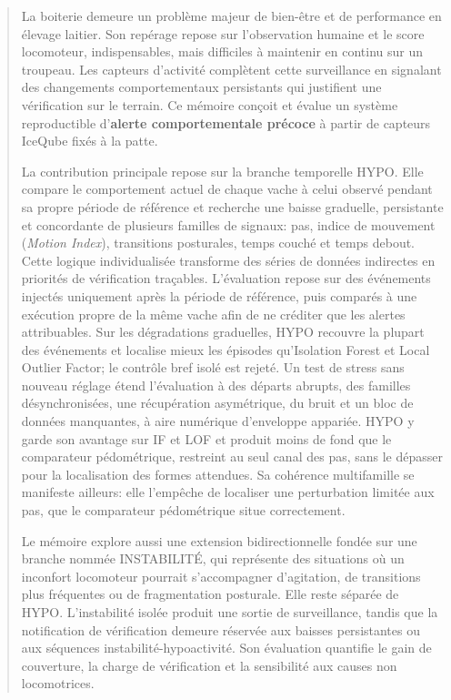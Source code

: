 \begin{abstract}
\noindent
La boiterie demeure un problème majeur de bien-être et de performance en élevage laitier. Son
repérage repose sur l'observation humaine et le score locomoteur, indispensables, mais difficiles
à maintenir en continu sur un troupeau. Les capteurs d'activité complètent cette surveillance en
signalant des changements comportementaux persistants qui justifient une vérification sur le terrain.
Ce mémoire conçoit et évalue un système reproductible d'\textbf{alerte comportementale précoce}
à partir de capteurs IceQube fixés à la patte.

La contribution principale repose sur la branche temporelle HYPO. Elle compare le comportement
actuel de chaque vache à celui observé pendant sa propre période de référence et recherche une
baisse graduelle, persistante et concordante de
plusieurs familles de signaux: pas, indice de mouvement (\textit{Motion Index}), transitions
posturales, temps couché et temps debout. Cette logique individualisée transforme des séries de données indirectes en priorités de
vérification traçables. L'évaluation repose sur des événements injectés uniquement après la
période de référence, puis comparés à une exécution propre de la même vache afin de ne créditer
que les alertes attribuables. Sur les dégradations graduelles, HYPO recouvre la plupart
des événements et localise mieux les épisodes qu'Isolation Forest et Local Outlier Factor; le
contrôle bref isolé est rejeté. Un test de stress sans nouveau réglage étend l'évaluation à des
départs abrupts, des familles désynchronisées, une récupération asymétrique, du bruit et un
bloc de données manquantes, à aire numérique d'enveloppe appariée. HYPO y garde son avantage sur
IF et LOF et produit moins de fond que le comparateur
pédométrique, restreint au seul canal des pas, sans le dépasser pour la
localisation des formes attendues. Sa cohérence multifamille se manifeste ailleurs: elle
l'empêche de localiser une perturbation limitée aux pas, que le comparateur pédométrique situe
correctement.

Le mémoire explore aussi une extension bidirectionnelle fondée sur une branche nommée INSTABILITÉ,
qui représente des situations où un inconfort locomoteur pourrait s'accompagner d'agitation, de
transitions plus fréquentes ou de fragmentation posturale. Elle reste séparée de HYPO.
L'instabilité isolée produit une sortie de surveillance, tandis que la notification de
vérification demeure réservée aux baisses persistantes ou aux séquences
instabilité-hypoactivité. Son évaluation quantifie le gain de couverture, la charge de
vérification et la sensibilité aux causes non locomotrices.


\end{abstract}
